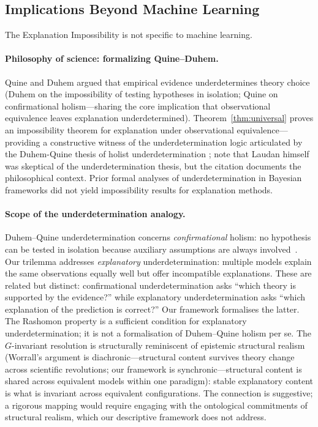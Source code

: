 \documentclass[11pt,a4paper]{article}
\begin{document}
\subsection{Implications Beyond Machine Learning}
\label{sec:beyond-ml}

The Explanation Impossibility is not specific to machine learning.

\paragraph{Philosophy of science: formalizing Quine--Duhem.}
Quine \citep{quine1951dogmas} and Duhem \citep{duhem1906aim} argued that
empirical evidence underdetermines theory choice
(Duhem on the impossibility of testing hypotheses in isolation; Quine on
confirmational holism---sharing the core implication that observational
equivalence leaves explanation underdetermined).  Theorem~\ref{thm:universal}
proves an impossibility theorem for explanation under observational
equivalence---providing a constructive witness of the underdetermination logic
articulated by the Duhem-Quine thesis of holist underdetermination
\citep{laudan1991empirical}; note that Laudan himself was skeptical of the
underdetermination thesis, but the citation documents the philosophical context.
Prior formal analyses of underdetermination in Bayesian
frameworks \citep{dorling1979bayesian,howson2006scientific} did not yield
impossibility results for explanation methods.

\paragraph{Scope of the underdetermination analogy.}
Duhem--Quine underdetermination concerns \emph{confirmational} holism: no hypothesis can be tested in isolation because auxiliary assumptions are always involved~\cite{stanford2006exceeding}. Our trilemma addresses \emph{explanatory} underdetermination: multiple models explain the same observations equally well but offer incompatible explanations. These are related but distinct: confirmational underdetermination asks ``which theory is supported by the evidence?'' while explanatory underdetermination asks ``which explanation of the prediction is correct?'' Our framework formalises the latter. The Rashomon property is a sufficient condition for explanatory underdetermination; it is not a formalisation of Duhem--Quine holism per se. The $G$-invariant
resolution is structurally reminiscent of epistemic structural
realism \citep{worrall1989structural}
(Worrall's argument is diachronic---structural content survives theory change
across scientific revolutions; our framework is synchronic---structural content
is shared across equivalent models within one paradigm): stable explanatory
content is what is invariant across equivalent configurations. The connection
is suggestive; a rigorous mapping would require engaging with the ontological
commitments of structural realism, which our descriptive framework does not
address.
\end{document}
